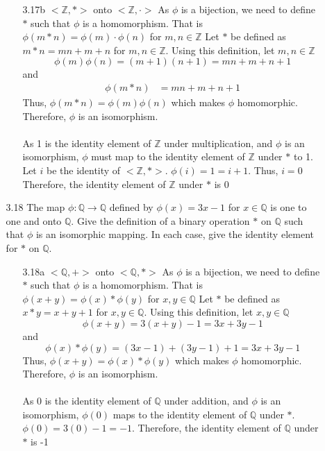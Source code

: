 \documentclass[12pt]{article}
\newcommand{\Z}{\mathds{Z}}
\newcommand{\Q}{\mathbb{Q}}
\begin{document}
\begin{enumerate}
\begin{enumerate}
\begin{enumerate}
				\item[3.17b] $<\Z,*>$ onto $<\Z,\cdot>$
				As $ \phi $ is a bijection, we need to define $ * $ such that $ \phi $ is a homomorphism. That is $ \phi(m*n)=\phi(m)\cdot\phi(n) $ for $ m,n \in\Z $
				Let $ * $ be defined as $ m*n = mn+m+n$ for $ m,n\in\Z $. Using this definition, let $ m,n\in\Z $
				\[\phi(m)\phi(n)=(m+1)(n+1)=mn+m+n+1\] and
				\begin{align*}
					\phi(m * n) &= mn+m+n+1
				\end{align*}
				Thus, $ \phi(m*n)=\phi(m)\phi(n) $ which makes $ \phi $ homomorphic.\\
				Therefore, $ \phi $ is an isomorphism.\\
				\\
				As 1 is the identity element of $\Z$  under multiplication, and $ \phi $ is an isomorphism, $ \phi $ must map to the identity element of $ \Z $ under $ * $ to 1. Let $i$ be the identity of $<\Z,*>$. $ \phi(i) = 1 = i +1 $. Thus, $i=0$ Therefore, the identity element of $ \Z $ under $ * $ is 0
			\end{enumerate}
			
			\item[3.18] The map $\phi: \Q \rightarrow \Q$ defined by $\phi(x)=3x-1$ for $x \in \Q$ is one to one and onto $\Q$. Give the definition of a binary operation $*$ on $\Q$ such that $\phi$ is an isomorphic mapping. In each case, give the identity element for $*$ on $\Q$.
			\begin{enumerate}
				\item[3.18a] $<\Q,+>$ onto $<\Q,*>$
					As $ \phi $ is a bijection, we need to define $ * $ such that $ \phi $ is a homomorphism. That is $ \phi(x+y)=\phi(x)*\phi(y) $ for $ x,y \in\Q $
					Let $ * $ be defined as $ x*y = x+y+1$ for $ x,y\in\Q $. Using this definition, let $ x,y\in\Q $
					\[\phi(x+y)=3(x+y)-1=3x+3y-1\] and
					\[\phi(x)*\phi(y) = (3x-1)+(3y-1)+1=3x+3y-1\]
					Thus, $ \phi(x+y)=\phi(x)*\phi(y) $ which makes $ \phi $ homomorphic.\\
					Therefore, $ \phi $ is an isomorphism.\\
					\\
					As 0 is the identity element of $\Q$  under addition, and $ \phi $ is an isomorphism, $ \phi(0) $ maps to the identity element of $ \Q $ under $ * $. $ \phi(0) = 3(0)-1=-1 $. Therefore, the identity element of $ \Q $ under $ * $ is -1
					

\end{enumerate}
\end{enumerate}
\end{enumerate}
\end{document}
